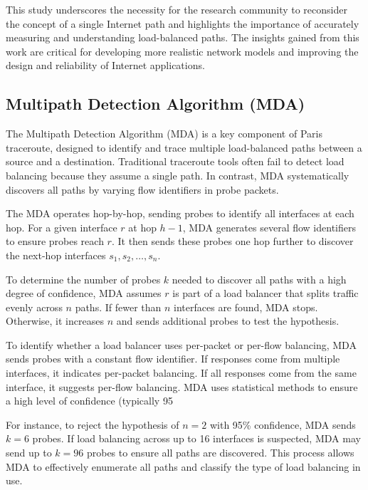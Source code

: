 \documentclass[12pt]{cwru_thesis}
\begin{document}
This study underscores the necessity for the research community to reconsider the concept of a single Internet path and highlights the importance of accurately measuring and understanding load-balanced paths. The insights gained from this work are critical for developing more realistic network models and improving the design and reliability of Internet applications.

\subsection{Multipath Detection Algorithm (MDA)}

The Multipath Detection Algorithm (MDA) is a key component of Paris traceroute, designed to identify and trace multiple load-balanced paths between a source and a destination. Traditional traceroute tools often fail to detect load balancing because they assume a single path. In contrast, MDA systematically discovers all paths by varying flow identifiers in probe packets.

The MDA operates hop-by-hop, sending probes to identify all interfaces at each hop. For a given interface \(r\) at hop \(h-1\), MDA generates several flow identifiers to ensure probes reach \(r\). It then sends these probes one hop further to discover the next-hop interfaces \(s_1, s_2, \ldots, s_n\).

To determine the number of probes \(k\) needed to discover all paths with a high degree of confidence, MDA assumes \(r\) is part of a load balancer that splits traffic evenly across \(n\) paths. If fewer than \(n\) interfaces are found, MDA stops. Otherwise, it increases \(n\) and sends additional probes to test the hypothesis.

To identify whether a load balancer uses per-packet or per-flow balancing, MDA sends probes with a constant flow identifier. If responses come from multiple interfaces, it indicates per-packet balancing. If all responses come from the same interface, it suggests per-flow balancing. MDA uses statistical methods to ensure a high level of confidence (typically 95%

For instance, to reject the hypothesis of \(n = 2\) with 95\% confidence, MDA sends \(k = 6\) probes. If load balancing across up to 16 interfaces is suspected, MDA may send up to \(k = 96\) probes to ensure all paths are discovered. This process allows MDA to effectively enumerate all paths and classify the type of load balancing in use.
\end{document}

